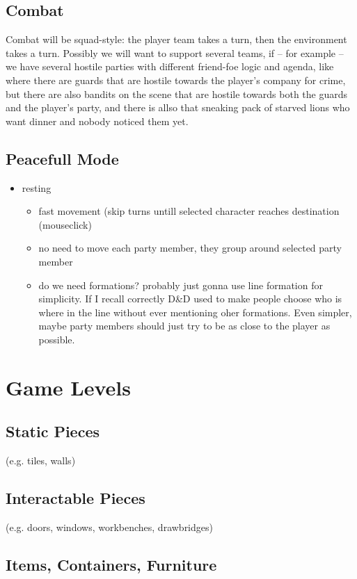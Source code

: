 \documentclass[a4paper,10pt]{book}
\begin{document}
\section{Combat}
Combat will be squad-style: the player team takes a turn, then the environment
takes a turn. Possibly we will want to support several teams, if -- for example
-- we have several hostile parties with different friend-foe logic and agenda,
like where there are guards that are hostile towards the player's company for
crime, but there are also bandits on the scene that are hostile towards both the
guards and the player's party, and there is allso that sneaking pack of starved
lions who want dinner and nobody noticed them yet.

\section{Peacefull Mode}
\begin{itemize}
\item resting
  \begin{itemize}
  \item fast movement (skip turns untill selected character reaches destination
    (mouseclick)
    \item no need to move each party member, they group around selected party
      member
    \item do we need formations? probably just gonna use line formation for simplicity.
      If I recall correctly D\&D used to make people choose who is where in the
      line without ever mentioning oher formations. Even simpler, maybe party
      members should just try to be as close to the player as possible.
  \end{itemize}
\end{itemize}

\chapter{Game Levels}
\section{Static Pieces}
(e.g.  tiles, walls)
\section{Interactable Pieces}
(e.g. doors, windows, workbenches, drawbridges)
\section{Items, Containers, Furniture}
\end{document}
